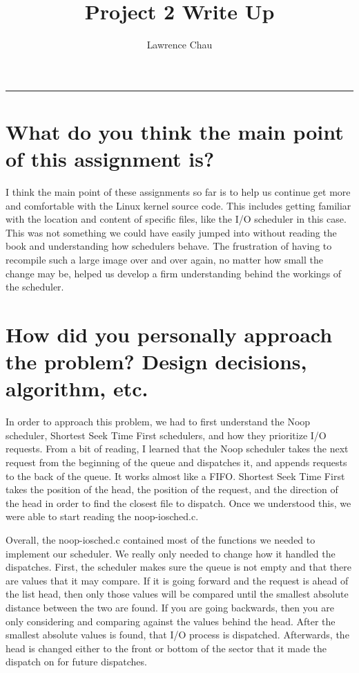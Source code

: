 \documentclass[letterpaper,10pt,notitlepage,fleqn]{article}
\title{Project 2 Write Up}
\author{Lawrence Chau}
\begin{document}
\maketitle
\hrule

\section*{What do you think the main point of this assignment is?}
I think the main point of these assignments so far is to help us continue get more and comfortable with the Linux kernel source code. This includes getting familiar with the location and content of specific files, like the I/O scheduler in this case. This was not something we could have easily jumped into without reading the book and understanding how schedulers behave. The frustration of having to recompile such a large image over and over again, no matter how small
the change may be, helped us develop a firm understanding behind the workings of the scheduler. 

\section*{How did you personally approach the problem? Design decisions, algorithm, etc.}
In order to approach this problem, we had to first understand the Noop scheduler, Shortest Seek Time First schedulers, and how they prioritize I/O requests. From a bit of reading, I learned that the Noop scheduler takes the next request from the beginning of the queue and dispatches it, and appends requests to the back of the queue. It works almost like a FIFO. Shortest Seek Time First takes the position of the head, the position of the request, and the direction of the head in order to find the closest file to dispatch. Once we understood this, we were able to start reading the noop-iosched.c.

Overall, the noop-iosched.c contained most of the functions we needed to implement our scheduler. We really only needed to change how it handled the dispatches. First, the scheduler makes sure the queue is not empty and that there are values that it may compare. If it is going forward and the request is ahead of the list head, then only those values will be compared until the smallest absolute distance between the two are found. If you are going backwards, then you are only considering and comparing against the values behind the head. After the smallest absolute values is found, that I/O process is dispatched. Afterwards, the head is changed either to the front or bottom of the sector that it made the dispatch on for future dispatches.
\end{document}
